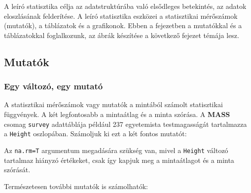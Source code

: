 \documentclass[
]{book}
\newenvironment{Shaded}{\begin{snugshade}}{\end{snugshade}}
\newcommand{\AttributeTok}[1]{\textcolor[rgb]{0.77,0.63,0.00}{#1}}
\newcommand{\CommentTok}[1]{\textcolor[rgb]{0.56,0.35,0.01}{\textit{#1}}}
\newcommand{\FunctionTok}[1]{\textcolor[rgb]{0.00,0.00,0.00}{#1}}
\newcommand{\NormalTok}[1]{#1}
\newcommand{\SpecialCharTok}[1]{\textcolor[rgb]{0.00,0.00,0.00}{#1}}
\newcommand{\StringTok}[1]{\textcolor[rgb]{0.31,0.60,0.02}{#1}}
\begin{document}
A leíró statisztika célja az adatstruktúrába való elsődleges betekintés, az adatok eloszlásának felderítése. A leíró statisztika eszközei a statisztikai mérőszámok (mutatók), a táblázatok és a grafikonok. Ebben a fejezetben a mutatókkal és a táblázatokkal foglalkozunk, az ábrák készítése a következő fejezet témája lesz.

\hypertarget{mutatuxf3k}{%
\subsection{Mutatók}\label{mutatuxf3k}}

\hypertarget{egy-vuxe1ltozuxf3-egy-mutatuxf3}{%
\subsubsection{Egy változó, egy mutató}\label{egy-vuxe1ltozuxf3-egy-mutatuxf3}}

A statisztikai mérőszámok vagy mutatók a mintából számolt statisztikai függvények. A két legfontosabb a mintaátlag és a minta szórása. A \textbf{MASS} csomag \texttt{survey} adattáblája például 237 egyetemista testmagasságát tartalmazza a \texttt{Height} oszlopában. Számoljuk ki ezt a két fontos mutatót:

\begin{Shaded}
\end{Shaded}

Az \texttt{na.rm=T} argumentum megadására szükség van, mivel a \texttt{Height} változó tartalmaz hiányzó értékeket, csak így kapjuk meg a mintaátlagot és a minta szórását.

Természetesen további mutatók is számolhatók:
\end{document}
